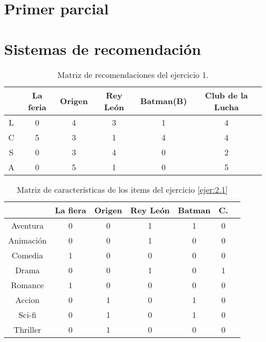 
\section{Primer parcial}

\section{Sistemas de recomendación}

\begin{table}[hbtp]
\centering
\begin{tabular}{c|ccccc}
&La feria & Origen & Rey León & Batman(B) & Club de la Lucha\\\hline
L&0&4&3&1&4\\
C&5&3&1&4&4\\
S&0&3&4&0&2\\
A&0&5&1&0&5
\end{tabular}
\caption{Matriz de recomendaciones del ejercicio 1.}
\label{data_ejer_2.1}
\end{table}

\begin{table}[hbtp]
\centering
\begin{tabular}{c|cccccc}
&La fiera & Origen & Rey León & Batman & C.\\\hline
Aventura 	&	0	&	0	&	1	&	1	&	0	\\
Animación	&	0	&	0	&	1	&	0	&	0	\\
Comedia		&	1	&	0	&	0	&	0	&	0	\\
Drama		&	0	&	0	&	1	&	0	&	1	\\
Romance		&	1	&	0	&	0	&	0	&	0	\\
Accion		&	0	&	1	&	0	&	1	&	0	\\
Sci-fi		&	0	&	1	&	0	&	1	&	0	\\
Thriller	&	0	&	1	&	0	&	0	&	0	
\end{tabular}
\caption{Matriz de características de los items del ejercicio \ref{ejer:2.1}}
\label{data_ejer_2.1_2}
\end{table}

